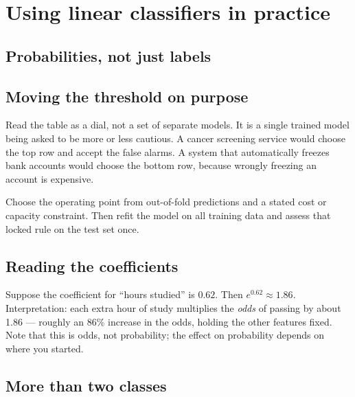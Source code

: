 \section{Using linear classifiers in practice}
\label{sec:logistic-practice}

\subsection{Probabilities, not just labels}

\subsection{Moving the threshold on purpose}

\begin{intuition}
Read the table as a dial, not a set of separate models. It is a single trained model being asked to be more or less cautious. A cancer screening service would choose the top row and accept the false alarms. A system that automatically freezes bank accounts would choose the bottom row, because wrongly freezing an account is expensive.
\end{intuition}

Choose the operating point from out-of-fold predictions and a stated cost or capacity constraint. Then refit the model on all training data and assess that locked rule on the test set once.

\subsection{Reading the coefficients}

\begin{workedexample}
Suppose the coefficient for ``hours studied'' is $0.62$. Then $e^{0.62}\approx 1.86$. Interpretation: each extra hour of study multiplies the \emph{odds} of passing by about 1.86 --- roughly an 86\% increase in the odds, holding the other features fixed. Note that this is odds, not probability; the effect on probability depends on where you started.
\end{workedexample}

\subsection{More than two classes}

